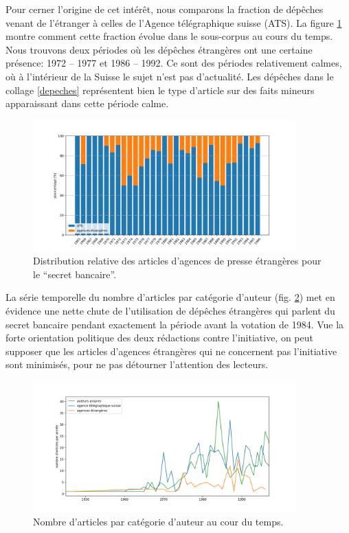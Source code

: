 \documentclass[11pt]{article}
\begin{document}
Pour cerner l'origine de cet intérêt, nous comparons la fraction de
dépêches venant de l'étranger à celles de l'Agence télégraphique suisse
(ATS). La figure \ref{percentage1} montre comment cette fraction évolue
dans le sous-corpus au cours du temps. Nous trouvons deux périodes où
les dépêches étrangères ont une certaine présence: 1972 -- 1977 et 1986
-- 1992. Ce sont des périodes relativement calmes, où à l'intérieur de
la Suisse le sujet n'est pas d'actualité. Les dépêches dans le collage
\ref{depeches} représentent bien le type d'article sur des faits mineurs
apparaissant dans cette période calme.

\begin{figure}
\centering
\includegraphics[width=0.9\textwidth ]{analysis/agency_percentage.png}
\caption{\label{percentage1} Distribution relative des articles
d'agences de presse étrangères pour le ``secret bancaire''.}
\end{figure}

La série temporelle du nombre d'articles par catégorie d'auteur (fig.
\ref{categorie}) met en évidence une nette chute de l'utilisation de
dépêches étrangères qui parlent du secret bancaire pendant exactement la
période avant la votation de 1984. Vue la forte orientation politique
des deux rédactions contre l'initiative, on peut supposer que les
articles d'agences étrangères qui ne concernent pas l'initiative sont
minimisés, pour ne pas détourner l'attention des lecteurs.

\begin{figure}
\centering
\includegraphics[width=0.9\textwidth ]{analysis/authors_agency_count.png}
\caption{\label{categorie} Nombre d'articles par catégorie d'auteur au
cour du temps.}
\end{figure}
\end{document}
